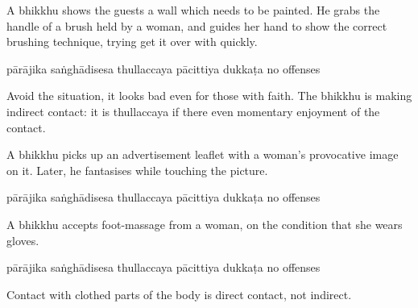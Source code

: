 \begin{exam}{\autoExamName}
\begin{problem*}
\begin{parts}
    \bigskip

  \item A bhikkhu shows the guests a wall which needs to be painted. He grabs the
  handle of a brush held by a woman, and guides her hand to show the correct
  brushing technique, trying get it over with quickly.

  \bigskip

  \begin{answers}{6}
    \bChoices
     pārājika\eAns
     saṅghādisesa\eAns
     thullaccaya\eAns
     pācittiya\eAns
     dukkaṭa\eAns
     no offenses\eAns
    \eChoices
  \end{answers}

  \begin{solution}
    Avoid the situation, it looks bad even for those with faith. The bhikkhu is
    making indirect contact: it is thullaccaya if there even momentary enjoyment
    of the contact.
  \end{solution}

  \bigskip

  \item A bhikkhu picks up an advertisement leaflet with a woman's provocative
    image on it. Later, he fantasises while touching the picture.

  \bigskip

  \begin{answers}{6}
    \bChoices
     pārājika\eAns
     saṅghādisesa\eAns
     thullaccaya\eAns
     pācittiya\eAns
     dukkaṭa\eAns
     no offenses\eAns
    \eChoices
  \end{answers}

  \bigskip

  \item A bhikkhu accepts foot-massage from a woman, on the condition that she wears gloves.

  \bigskip

  \begin{answers}{6}
    \bChoices
     pārājika\eAns
     saṅghādisesa\eAns
     thullaccaya\eAns
     pācittiya\eAns
     dukkaṭa\eAns
     no offenses\eAns
    \eChoices
  \end{answers}

  \begin{solution}
    Contact with clothed parts of the body is direct contact, not indirect.
  \end{solution}


\end{parts}
\end{problem*}
\end{exam}

